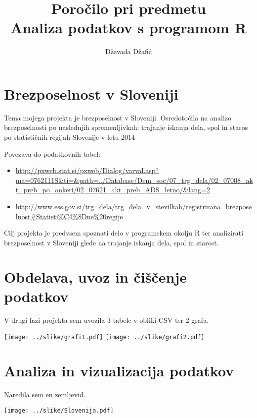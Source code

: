 \documentclass[11pt,a4paper]{article}
\begin{document}
\title{Poročilo pri predmetu \\
Analiza podatkov s programom R}
\author{Dževada Džafić}
\maketitle

\section{Brezposelnost v Sloveniji}

Tema mojega projekta je brezposelnost v Sloveniji. Osredotočila na analizo brezposelnosti po naslednjih spremenljivkah: trajanje iskanja dela, spol in staros po statističnih regijah Slovenije v letu 2014

Povezava do podatkovnih tabel:
\begin{itemize}

\item \url{http://pxweb.stat.si/pxweb/Dialog/varval.asp?ma=0762111S&ti=&path=../Database/Dem_soc/07_trg_dela/02_07008_akt_preb_po_anketi/02_07621_akt_preb_ADS_letno/&lang=2}
\item \url{http://www.ess.gov.si/trg_dela/trg_dela_v_stevilkah/registrirana_brezposelnost#Statisti%C4%8Dne%20regije}

\end{itemize}

Cilj projekta je predvsem spoznati delo v programskem okolju R ter analizirati brezposelnost v Sloveniji glede na trajanje iskanja dela, spol in starost.


\section{Obdelava, uvoz in čiščenje podatkov}

V drugi fazi projekta sem uvozila 3 tabele v obliki CSV ter 2 grafa.

\texttt{[image: ../slike/grafi1.pdf]}
\texttt{[image: ../slike/grafi2.pdf]}
\newpage

\section{Analiza in vizualizacija podatkov}

Naredila sem en zemljevid.

\texttt{[image: ../slike/Slovenija.pdf]}


% 
% 
\end{document}
